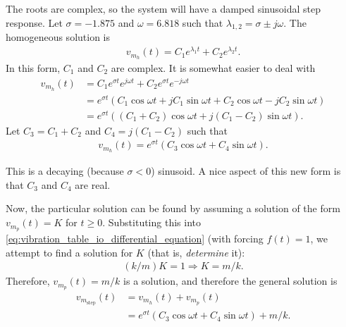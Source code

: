 \documentclass[dynamic_systems.tex]{subfiles}
\begin{document}
The roots are complex, so the system will have a damped sinusoidal step response.
Let $\sigma = -1.875$ and $\omega = 6.818$ such that $\lambda_{1,2} = \sigma \pm j\omega$.
The homogeneous solution is
\tags{}
\begin{align}
	v_{m_h}(t) = C_1 e^{\lambda_1 t} + C_2 e^{\lambda_2 t}.
\end{align}
In this form, $C_1$ and $C_2$ are complex.
It is somewhat easier to deal with 
\begin{subequations}
\begin{align}
	v_{m_h}(t) &= C_1 e^{\sigma t} e^{j\omega t} + C_2 e^{\sigma t} e^{-j\omega t} \\
	&= e^{\sigma t}
		\left(
			C_1 \cos\omega t + j C_1 \sin\omega t +
			C_2 \cos\omega t - j C_2 \sin\omega t
		\right)\\
	&= e^{\sigma t}
		\left(
			(C_1+C_2) \cos\omega t + j (C_1-C_2) \sin\omega t
		\right).
\end{align}
\end{subequations}
Let $C_3 = C_1+C_2$ and $C_4 = j (C_1-C_2)$ such that
\begin{align}
	v_{m_h}(t) = e^{\sigma t}
		\left(
			C_3 \cos\omega t + C_4 \sin\omega t
		\right).
\end{align}

This is a decaying (because $\sigma<0$) sinusoid.
A nice aspect of this new form is that $C_3$ and $C_4$ are real.
\tags{}

Now, the particular solution can be found by assuming a solution of the form $v_{m_p}(t) = K$ for $t\ge 0$.
Substituting this into \autoref{eq:vibration_table_io_differential_equation} (with forcing $f(t) = 1$, we attempt to find a solution for $K$ (that is, \emph{determine} it):
\tags{}
\begin{align}
	(k/m) K = 1 \Rightarrow K = m/k.
\end{align}	
Therefore, $v_{m_p}(t) = m/k$ is a solution, and therefore the general solution is
\begin{subequations}
\begin{align}
	v_{m_\text{step}}(t) &= v_{m_h}(t) + v_{m_p}(t) \\
	&= e^{\sigma t}
		\left(
			C_3 \cos\omega t + C_4 \sin\omega t
		\right)
		+
		m/k.
\end{align}
\end{subequations}
\end{document}
